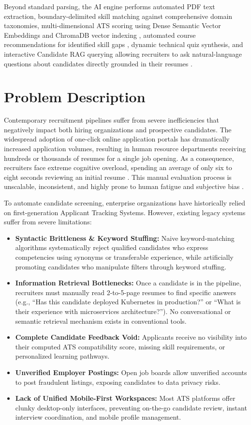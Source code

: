 Beyond standard parsing, the AI engine performs automated PDF text extraction, boundary-delimited skill matching against comprehensive domain taxonomies, multi-dimensional ATS scoring using Dense Semantic Vector Embeddings and ChromaDB vector indexing \cite{reimers2019sentence, malkov2018hnsw}, automated course recommendations for identified skill gaps \cite{karimi2020course}, dynamic technical quiz synthesis, and interactive Candidate RAG querying allowing recruiters to ask natural-language questions about candidates directly grounded in their resumes \cite{lewis2020rag}.

\section{Problem Description}
Contemporary recruitment pipelines suffer from severe inefficiencies that negatively impact both hiring organizations and prospective candidates. The widespread adoption of one-click online application portals has dramatically increased application volumes, resulting in human resource departments receiving hundreds or thousands of resumes for a single job opening. As a consequence, recruiters face extreme cognitive overload, spending an average of only six to eight seconds reviewing an initial resume \cite{parasuraman2021ats}. This manual evaluation process is unscalable, inconsistent, and highly prone to human fatigue and subjective bias \cite{kessler2021hiring}.

To automate candidate screening, enterprise organizations have historically relied on first-generation Applicant Tracking Systems. However, existing legacy systems suffer from severe limitations:
\begin{itemize}
    \item \textbf{Syntactic Brittleness \& Keyword Stuffing:} Naive keyword-matching algorithms systematically reject qualified candidates who express competencies using synonyms or transferable experience, while artificially promoting candidates who manipulate filters through keyword stuffing.
    \item \textbf{Information Retrieval Bottlenecks:} Once a candidate is in the pipeline, recruiters must manually read 2-to-5-page resumes to find specific answers (e.g., ``Has this candidate deployed Kubernetes in production?'' or ``What is their experience with microservices architecture?''). No conversational or semantic retrieval mechanism exists in conventional tools.
    \item \textbf{Complete Candidate Feedback Void:} Applicants receive no visibility into their computed ATS compatibility score, missing skill requirements, or personalized learning pathways.
    \item \textbf{Unverified Employer Postings:} Open job boards allow unverified accounts to post fraudulent listings, exposing candidates to data privacy risks.
    \item \textbf{Lack of Unified Mobile-First Workspaces:} Most ATS platforms offer clunky desktop-only interfaces, preventing on-the-go candidate review, instant interview coordination, and mobile profile management.
\end{itemize}

